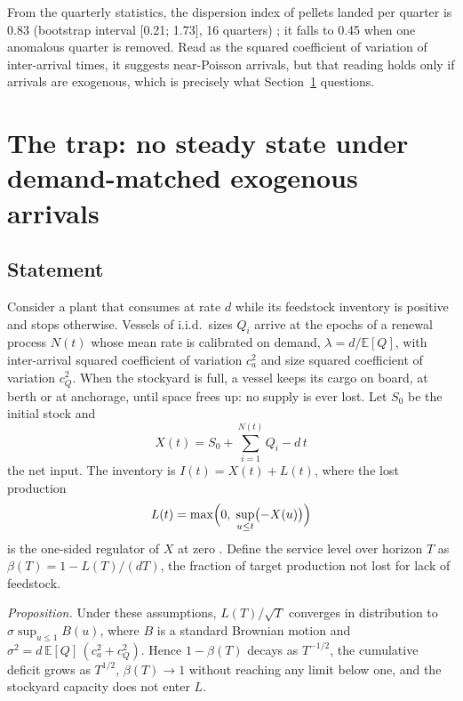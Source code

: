 \documentclass[conference]{IEEEtran}   %
\begin{document}
From the quarterly statistics, the dispersion index of pellets landed per quarter is 0.83
(bootstrap interval [0.21; 1.73], 16 quarters) \cite{efron1979}; it falls to 0.45 when
one anomalous quarter is removed. Read as the squared coefficient of variation of
inter-arrival times, it suggests near-Poisson arrivals, but that reading holds only if
arrivals are exogenous, which is precisely what Section~\ref{sec:trap} questions.

\section{The trap: no steady state under demand-matched exogenous arrivals}
\label{sec:trap}

\subsection{Statement}
Consider a plant that consumes at rate $d$ while its feedstock inventory is positive and
stops otherwise. Vessels of i.i.d.\ sizes $Q_i$ arrive at the epochs of a renewal process
$N(t)$ whose mean rate is calibrated on demand, $\lambda = d/\mathbb{E}[Q]$, with
inter-arrival squared coefficient of variation $c_a^2$ and size squared coefficient of
variation $c_Q^2$. When the stockyard is full, a vessel keeps its cargo on board, at berth
or at anchorage, until space frees up: no supply is ever lost. Let $S_0$ be the initial
stock and
\begin{equation}
X(t) = S_0 + \sum_{i=1}^{N(t)} Q_i - d\,t
\end{equation}
the net input. The inventory is $I(t) = X(t) + L(t)$, where the lost production
\begin{equation}
L(t) = \max\Bigl(0,\; \sup_{u\le t} \bigl(-X(u)\bigr)\Bigr)
\end{equation}
is the one-sided regulator of $X$ at zero \cite{whitt2002}. Define the
service level over horizon $T$ as $\beta(T) = 1 - L(T)/(dT)$, the fraction of target
production not lost for lack of feedstock.

\emph{Proposition.} Under these assumptions, $L(T)/\sqrt{T}$ converges in distribution to
$\sigma \sup_{u\le 1} B(u)$, where $B$ is a standard Brownian motion and
$\sigma^2 = d\,\mathbb{E}[Q]\,(c_a^2 + c_Q^2)$. Hence $1-\beta(T)$ decays as $T^{-1/2}$, the
cumulative deficit grows as $T^{1/2}$, $\beta(T)\to 1$ without reaching any limit below one,
and the stockyard capacity does not enter $L$.
\end{document}
